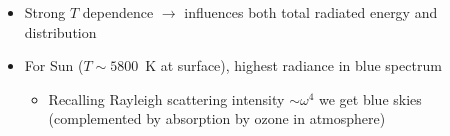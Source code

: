 \documentclass[11pt, oneside]{article}
\begin{document}
\begin{itemize}
\begin{itemize}
\begin{itemize}
			\item[$\hookrightarrow$] peak spectral radiance (of $B_\lambda$) at wavelength
			\begin{equation}
				\label{e:Wien}
				\underbrace{\lambda_\mathrm{max} = \frac{b_W}{T}}_{\text{Known as Wien's displacement}}
			\end{equation}
			where $b_W = 2.898\times10^{-3}$~m$\cdot$K $\equiv$ Wien's displacement const
			\item[$\hookrightarrow$] rapid drop off in radiance for $\lambda < \lambda_\mathrm{max}$ because it is hard for photons with energy $\gg k_BT$ (mean or characteristic energy) to be emitted
			\item[$\hookrightarrow$] long tail at $\lambda > \lambda_\mathrm{max}$ due to Boltzmann statistics
		\end{itemize}
		\item[--] Strong $T$ dependence $\rightarrow$ influences both total radiated energy and distribution
		\item[--] For Sun ($T \sim 5800$~K at surface), highest radiance in blue spectrum
		\begin{itemize}
			\item[$\hookrightarrow$] Recalling Rayleigh scattering intensity $\sim \omega^4$ we get blue skies (complemented by absorption by ozone in atmosphere)

\end{itemize}
\end{itemize}
\end{itemize}
\end{document}
